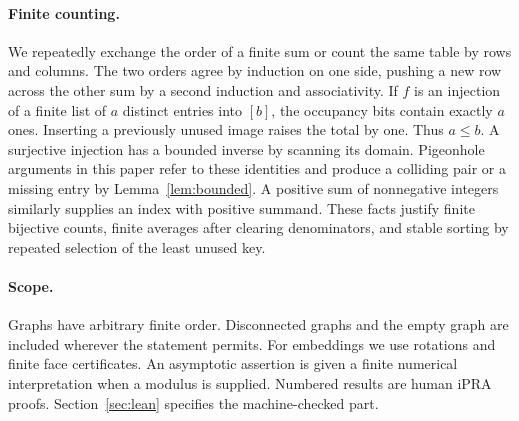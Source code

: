 \paragraph{Finite counting.}
We repeatedly exchange the order of a finite sum or count the same table
by rows and columns. The two orders agree by induction on one side, pushing
a new row across the other sum by a second induction and associativity.
If $f$ is an injection of a finite list of $a$ distinct entries into $[b]$,
the occupancy bits contain exactly $a$ ones. Inserting a previously unused
image raises the total by one. Thus $a\le b$. A surjective injection has a
bounded inverse by scanning its domain. Pigeonhole arguments in this paper
refer to these identities and produce a colliding pair or a missing entry
by Lemma~\ref{lem:bounded}. A positive sum of nonnegative integers similarly
supplies an index with positive summand. These facts justify finite bijective
counts, finite averages after clearing denominators, and stable sorting by
repeated selection of the least unused key.

\paragraph{Scope.}
Graphs have arbitrary finite order. Disconnected graphs and the empty graph
are included wherever the statement permits. For embeddings we use rotations
and finite face certificates. An asymptotic assertion is given a finite
numerical interpretation when a modulus is supplied. Numbered results are
human iPRA proofs. Section~\ref{sec:lean} specifies the machine-checked part.
